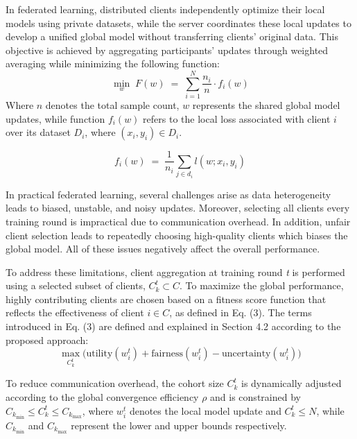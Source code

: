 \documentclass[pdflatex,sn-mathphys-num,oneside]{sn-jnl}%
\theoremstyle{thmstyleone}%
\theoremstyle{thmstyletwo}%
\theoremstyle{thmstylethree}%
\begin{document}
In federated learning, distributed clients independently optimize their local models using private datasets, while the server coordinates these local updates to develop a unified global model without transferring clients’ original data. This objective is achieved by aggregating participants’ updates through weighted averaging while minimizing the following function:
\begin{equation}
\min_{w}\;F(w) \;=\; \sum_{i = 1}^{N} \frac{n_i}{n}\cdot f_i(w)
\label{eq:global_obj}
\end{equation}
Where $n$ denotes the total sample count, $w$ represents the shared global model updates, while function $f_i(w)$ refers to the local loss associated with client $i$ over its dataset $D_i$, where $(x_i,y_i )\in D_i$.


\begin{equation}
f_i(w) \;=\; \frac{1}{n_i}\sum_{j \in d_i} l(w; x_i, y_i)
\label{eq:local_obj}
\end{equation}

In practical federated learning, several challenges arise as data heterogeneity leads to biased, unstable, and noisy updates. Moreover, selecting all clients every training round is impractical due to communication overhead. In addition, unfair client selection leads to repeatedly choosing high-quality clients which biases the global model. All of these issues negatively affect the overall performance.

To address these limitations, client aggregation at training round \textit{t} is performed using a selected subset of clients, $C_k^t\subset C$. To maximize the global performance, highly contributing clients are chosen based on a fitness score function that reflects the effectiveness of client $i \in C$, as defined in Eq. (3). The terms introduced in Eq. (3) are defined and explained in Section 4.2 according to the proposed approach: 
\begin{equation}
\max_{C_k^t}
\Big(
\mathrm{utility}(w_i^t)
+
\mathrm{fairness}(w_i^t)
-
\mathrm{uncertainty}(w_i^t)
\Big)
\label{eq:client_selection}
\end{equation}

To reduce communication overhead, the cohort size $C_k^t$ is dynamically adjusted according to the global convergence efficiency $\rho$ and is constrained by $C_{k_{\min}} \leq C_k^t \leq C_{k_{\max}}$, where $w_i^t$  denotes the local model update and $C_k^t \leq N$, while $C_{k_{\min}}$ and $C_{k_{\max}}$ represent the lower and upper bounds respectively.
\end{document}
